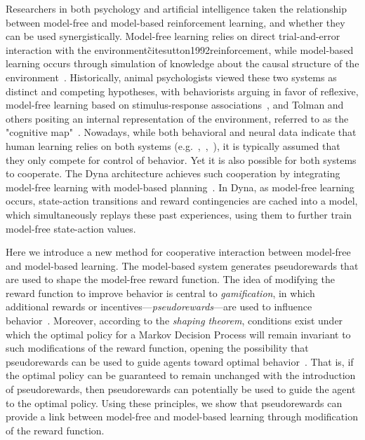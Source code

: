 \documentclass[letterpaper]{article}
\begin{document}
Researchers in both psychology and artificial intelligence taken the relationship between model-free and model-based reinforcement learning, and whether they can be used synergistically. Model-free learning relies on direct trial-and-error interaction with the environment\~cite{sutton1992reinforcement}, while model-based learning occurs through simulation of knowledge about the causal structure of the environment~\cite{barto1995learning}. Historically, animal psychologists viewed these two systems as distinct and competing hypotheses, with behaviorists arguing in favor of reflexive, model-free learning based on stimulus-response associations~\cite{thorndike1933proof}, and Tolman and others positing an internal representation of the environment, referred to as the "cognitive map"~\cite{tolman1948cognitive}. Nowadays, while both behavioral and neural data indicate that human learning relies on both systems (e.g.~\cite{daw2005uncertainty},~\cite{glascher2010states},~\cite{dayan2014model}), it is typically assumed that they only compete for control of behavior. Yet it is also possible for both systems to cooperate. The Dyna architecture achieves such cooperation by integrating model-free learning with model-based planning~\cite{sutton1991dyna}. In Dyna, as model-free learning occurs, state-action transitions and reward contingencies are cached into a model, which simultaneously replays these past experiences, using them to further train model-free state-action values.

Here we introduce a new method for cooperative interaction between model-free and model-based learning. The model-based system generates pseudorewards that are used to shape the model-free reward function. The idea of modifying the reward function to improve behavior is central to \textit{gamification}, in which additional rewards or incentives---\textit{pseudorewards}---are used to influence behavior~\cite{mcgonigal2011reality}. Moreover, according to the \textit{shaping theorem}, conditions exist under which the optimal policy for a Markov Decision Process will remain invariant to such modifications of the reward function, opening the possibility that pseudorewards can be used to guide agents toward optimal behavior~\cite{ng1999policy}. That is, if the optimal policy can be guaranteed to remain unchanged with the introduction of pseudorewards, then pseudorewards can potentially be used to guide the agent to the optimal policy. Using these principles, we show that pseudorewards can provide a link between model-free and model-based learning through modification of the reward function.
\end{document}
